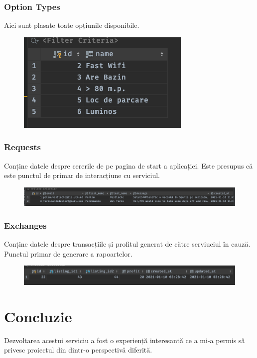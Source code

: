 \documentclass[12pt. a4paper]{report}
\begin{document}
\subsection{Option Types}
Aici sunt plasate toate opțiunile disponibile.

\begin{figure}[H]
\center
\includegraphics[width=\textwidth]{option_types_table}
\end{figure}


\subsection{Requests}
Conține datele despre cererile de pe pagina de start a aplicației. Este presupus că este punctul de primar de interacțiune cu serviciul.

\begin{figure}[H]
\center
\includegraphics[width=\textwidth]{requests_table}
\end{figure}


\subsection{Exchanges}
Conține datele despre transacțiile și profitul generat de către serviuciul în cauză. Punctul primar de generare a rapoartelor.

\begin{figure}[H]
\center
\includegraphics[width=\textwidth]{exchanges_table}
\end{figure}

\chapter{Concluzie}
Dezvoltarea acestui serviciu a fost o experiență interesantă ce a mi-a permis să privesc proiectul din dintr-o perspectivă diferită.
\end{document}
